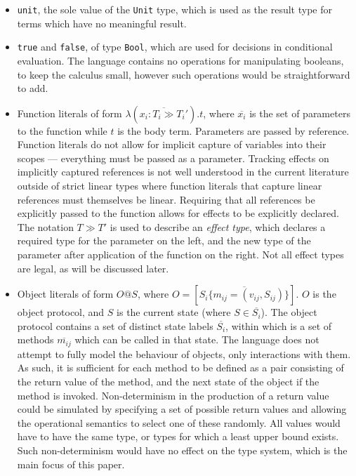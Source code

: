 \documentclass[preprint]{sigplanconf}
\newcommand{\funv}[4]{\lambda(\overline{#1 : #2 \gg #3}).#4}
\begin{document}
\begin{itemize}
\item {\tt unit}, the sole value of the {\tt Unit} type, which is used as
the result type for terms which have no meaningful result.

\item {\tt true} and {\tt false}, of type {\tt Bool}, which are used for
decisions in conditional evaluation. The language contains no operations
for manipulating booleans, to keep the calculus small, however
such operations would be straightforward to add.

\item Function literals of form $\funv{x_i}{T_i}{T_i'}{t}$, where
$\overline{x_i}$ is the set of parameters to the function while
$t$ is the body term. Parameters are passed by reference.
Function literals do not allow for implicit capture
of variables into their scopes --- everything must be passed as a parameter. 
Tracking effects on implicitly captured references is not well understood
in the current literature outside of strict linear types where
function literals that capture linear references must themselves be linear.
Requiring that all references be explicitly passed to the function allows for
effects to be explicitly declared. The notation $T \gg T'$ is used to
describe an {\it effect type}, which declares a required type for the parameter 
on the left, and the new type of the parameter after application of the function 
on the right. Not all effect types are legal, as will be discussed later.

\item Object literals of form 
$O@S$, where $O = \left[ \overline{ S_i \{ m_{ij} = (v_{ij}, S_{ij}) \} } \right]$. 
$O$ is the object protocol, and $S$ is the current state
(where $S \in \overline{S_i}$). The object protocol contains a set of
distinct state labels $\overline{S_i}$, within which is a set of methods 
$\overline{m_{ij}}$ 
which can be called in that state. The language does
not attempt to fully model the behaviour of objects, only interactions with
them. As such, it is sufficient for each method to be defined as a pair 
consisting of the return value of the method, and the next state of the object 
if the method is invoked. Non-determinism in the production of a return value 
could be simulated by specifying a set of possible return values and allowing 
the operational semantics to select one of these randomly.
All values would have to have the same type, or types for which a least upper 
bound exists. Such non-determinism would have no effect on the type system,
which is the main focus of this paper.
\end{itemize}
\end{document}
